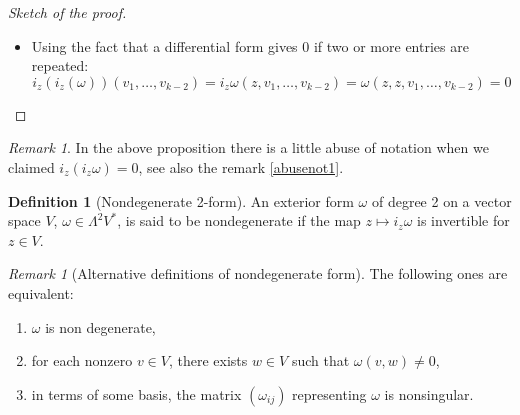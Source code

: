 \documentclass[a4paper,11pt,titlepage, article, oneside]{memoir}
\numberwithin{equation}{section}
\theoremstyle{definition}
\newtheorem{definition}[theorem]{Definition}
\theoremstyle{remark}
\newtheorem{remark}[theorem]{Remark}
\begin{document}
\begin{proof}[Sketch of the proof]
\begin{itemize}
\begin{enumerate}
\item $\sum\limits_{\substack{i_1 < \ldots i_k \\ j_1 < \ldots j_p }} (-1)^k a_{i_1 \cdots i_k} b_{j_1 \cdots j_p}  dx^{i_1} \wedge \ldots \wedge dx^{i_k}  \wedge i_z \left( dx^{j_1} \wedge \ldots \wedge dx^{j_p} \right)$ , for the same reason above, and we have the factor $(-1)^k$ because we moved the interior derivative $k$ times (it is like moving an entry of a $(k+p)$-form $k$ times),
\item 0
\end{enumerate}
Then, $i_z(\omega \wedge \eta)$ is the sum of these non-zero terms.
\item Using the fact that a differential form gives 0 if two or more entries are repeated:
$$i_z \left( i_z(\omega) \right) (v_1, \ldots, v_{k-2}) = i_z \omega (z, v_1, \ldots, v_{k-2}) = \omega (z, z, v_1, \ldots, v_{k-2}) = 0$$ \qedhere
\end{itemize}
\end{proof}

\begin{remarkbox}\begin{remark}
  In the above proposition there is a little abuse of notation when we claimed $i_z(i_z \omega) = 0$, see also the remark \ref{abusenot1}.
\end{remark}\end{remarkbox}

\begin{definition}[Nondegenerate 2-form]
An exterior form $\omega$ of degree 2 on a vector space $V$, $\omega \in \Lambda^2V^*$, is said to be nondegenerate if the map $z \mapsto i_z \omega$ is invertible for $z \in V$.
\end{definition}

\begin{remarkbox}\begin{remark}[Alternative definitions of nondegenerate form]
The following ones are equivalent:
\begin{enumerate}
\item $\omega$ is non degenerate,
\item for each nonzero $v \in V$, there exists $w \in V$ such that $\omega(v, w) \ne 0$,
\item in terms of some basis, the matrix $(\omega_{ij})$ representing $\omega$ is nonsingular.
\end{enumerate}

\end{remark}\end{remarkbox}
\end{document}
